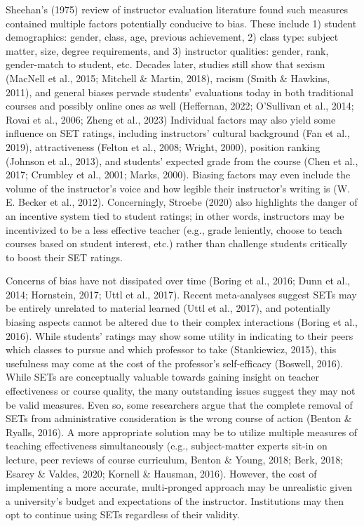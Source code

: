 \documentclass[
  man]{apa7}
\begin{document}
Sheehan's (1975) review of instructor evaluation literature
found such measures contained multiple factors potentially conducive to
bias. These include 1) student demographics: gender, class, age,
previous achievement, 2) class type: subject matter, size, degree
requirements, and 3) instructor qualities: gender, rank, gender-match to
student, etc. Decades later, studies still show that sexism
(MacNell et al., 2015; Mitchell \& Martin, 2018), racism (Smith \& Hawkins, 2011), and general biases
pervade students' evaluations today in both traditional courses and
possibly online ones as well (Heffernan, 2022; O'Sullivan et al., 2014; Rovai et al., 2006; Zheng et al., 2023) Individual factors may also yield some influence on SET
ratings, including instructors' cultural background (Fan et al., 2019),
attractiveness (Felton et al., 2008; Wright, 2000), position ranking
(Johnson et al., 2013), and students' expected grade from the course (Chen et al., 2017; Crumbley et al., 2001; Marks, 2000). Biasing factors may even include the volume
of the instructor's voice and how legible their instructor's writing is
(W. E. Becker et al., 2012). Concerningly, Stroebe (2020) also highlights the danger of
an incentive system tied to student ratings; in other words, instructors
may be incentivized to be a less effective teacher (e.g., grade
leniently, choose to teach courses based on student interest, etc.)
rather than challenge students critically to boost their SET ratings.

Concerns of bias have not dissipated over time (Boring et al., 2016; Dunn et al., 2014; Hornstein, 2017; Uttl et al., 2017). Recent meta-analyses suggest SETs may be
entirely unrelated to material learned (Uttl et al., 2017), and potentially
biasing aspects cannot be altered due to their complex interactions
(Boring et al., 2016). While students' ratings may show some utility in
indicating to their peers which classes to pursue and which professor to
take (Stankiewicz, 2015), this usefulness may come at the cost of the professor's
self-efficacy (Boswell, 2016). While SETs are conceptually valuable
towards gaining insight on teacher effectiveness or course quality, the
many outstanding issues suggest they may not be valid measures. Even so,
some researchers argue that the complete removal of SETs from
administrative consideration is the wrong course of action
(Benton \& Ryalls, 2016). A more appropriate solution may be to utilize multiple
measures of teaching effectiveness simultaneously (e.g., subject-matter
experts sit-in on lecture, peer reviews of course curriculum, Benton \& Young, 2018; Berk, 2018; Esarey \& Valdes, 2020; Kornell \& Hausman, 2016). However, the cost of
implementing a more accurate, multi-pronged approach may be unrealistic
given a university's budget and expectations of the instructor.
Institutions may then opt to continue using SETs regardless of their
validity.
\end{document}
